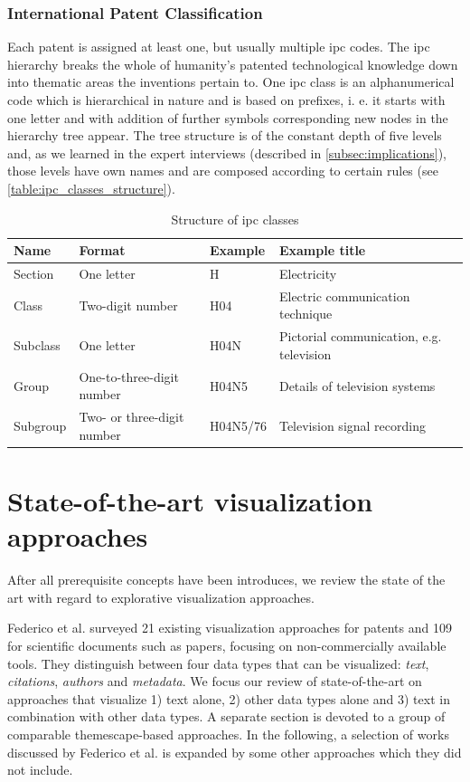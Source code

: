 \subsubsection{International Patent Classification}
\label{subsubsec:ipc_classification}

Each patent is assigned at least one, but usually multiple \gls{ipc} codes.
The \gls{ipc} hierarchy breaks the whole of humanity's patented technological knowledge down into thematic areas the inventions pertain to.
One \gls{ipc} class is an alphanumerical code which is hierarchical in nature and is based on prefixes, i. e. it starts with one letter and with addition of further symbols corresponding new nodes in the hierarchy tree appear.
The tree structure is of the constant depth of five levels and, as we learned in the expert interviews (described in \autoref{subsec:implications}), those levels have own names and are composed according to certain rules (see \autoref{table:ipc_classes_structure}).

\begin{table}[h!]
\centering
\begin{tabular}{||l l l l||} 
 \hline
 Name & Format & Example & Example title \\ [0.5ex] 
 \hline\hline
 Section & One letter & H & Electricity \\ 
 Class & Two-digit number & H04 & Electric communication technique  \\
 Subclass & One letter & H04N & Pictorial communication, e.g. television \\
 Group & One-to-three-digit number & H04N5 & Details of television systems \\
 Subgroup & Two- or three-digit number & H04N5/76 & Television signal recording \\ [1ex] 
 \hline
\end{tabular}
\caption{Structure of \gls{ipc} classes}
\label{table:ipc_classes_structure}
\end{table}

\section{State-of-the-art visualization approaches}
\label{sec:state_of_the_art}

After all prerequisite concepts have been introduces, we review the state of the art with regard to explorative visualization approaches.

Federico et al. \cite{Federico2017} surveyed 21 existing visualization approaches for patents and 109 for scientific documents such as papers, focusing on non-commercially available tools. 
They distinguish between four data types that can be visualized: \textit{text}, \textit{citations}, \textit{authors} and \textit{metadata}.
We focus our review of state-of-the-art on approaches that visualize 1) text alone, 2) other data types alone and 3) text in combination with other data types.
A separate section is devoted to a group of comparable themescape-based approaches.
In the following, a selection of works discussed by Federico et al. is expanded by some other approaches which they did not include.

